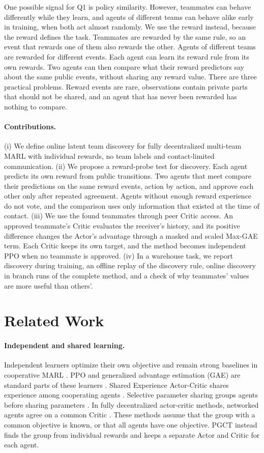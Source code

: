 \documentclass{article}
\begin{document}
One possible signal for Q1 is policy similarity. However, teammates can behave differently while they learn, and agents of different teams can behave alike early in training, when both act almost randomly. We use the reward instead, because the reward defines the task. Teammates are rewarded by the same rule, so an event that rewards one of them also rewards the other. Agents of different teams are rewarded for different events. Each agent can learn its reward rule from its own rewards. Two agents can then compare what their reward predictors say about the same public events, without sharing any reward value. There are three practical problems. Reward events are rare, observations contain private parts that should not be shared, and an agent that has never been rewarded has nothing to compare.

\paragraph{Contributions.} (i) We define online latent team discovery for fully decentralized multi-team MARL with individual rewards, no team labels and contact-limited communication. (ii) We propose a reward-probe test for discovery. Each agent predicts its own reward from public transitions. Two agents that meet compare their predictions on the same reward events, action by action, and approve each other only after repeated agreement. Agents without enough reward experience do not vote, and the comparison uses only information that existed at the time of contact. (iii) We use the found teammates through peer Critic access. An approved teammate's Critic evaluates the receiver's history, and its positive difference changes the Actor's advantage through a masked and scaled Max-GAE term. Each Critic keeps its own target, and the method becomes independent PPO when no teammate is approved. (iv) In a warehouse task, we report discovery during training, an offline replay of the discovery rule, online discovery in branch runs of the complete method, and a check of why teammates' values are more useful than others'.

\section{Related Work}
\paragraph{Independent and shared learning.}
Independent learners optimize their own objective and remain strong baselines in cooperative MARL \cite{tan,ippo,benchmark}. PPO and generalized advantage estimation (GAE) are standard parts of these learners \cite{ppo,gae,mappo}. Shared Experience Actor-Critic shares experience among cooperating agents \cite{seac}. Selective parameter sharing groups agents before sharing parameters \cite{seps}. In fully decentralized actor-critic methods, networked agents agree on a common Critic \cite{fdmarl}. These methods assume that the group with a common objective is known, or that all agents have one objective. PGCT instead finds the group from individual rewards and keeps a separate Actor and Critic for each agent.
\end{document}

